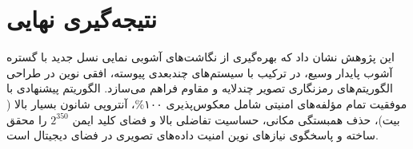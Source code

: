 \section{نتیجه‌گیری نهایی}

این پژوهش نشان داد که بهره‌گیری از نگاشت‌های آشوبی نمایی نسل جدید با گستره آشوب پایدار وسیع، در ترکیب با سیستم‌های چندبعدی پیوسته، افقی نوین در طراحی الگوریتم‌های رمزنگاری تصویر چندلایه و مقاوم فراهم می‌سازد. الگوریتم پیشنهادی با موفقیت تمام مؤلفه‌های امنیتی شامل معکوس‌پذیری ۱۰۰\%، آنتروپی شانون بسیار بالا ( بیت)، حذف همبستگی مکانی، حساسیت تفاضلی بالا و فضای کلید ایمن $2^{350}$ را محقق ساخته و پاسخگوی نیازهای نوین امنیت داده‌های تصویری در فضای دیجیتال است.